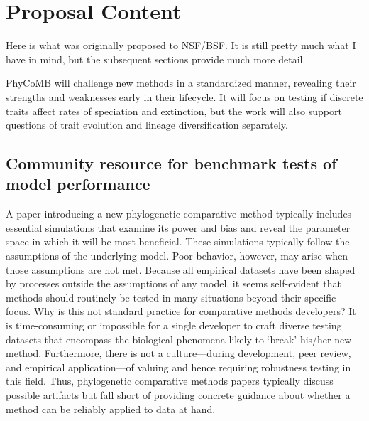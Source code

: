 \section{Proposal Content}

Here is what was originally proposed to NSF/BSF.
It is still pretty much what I have in mind, but the subsequent sections provide much more detail.

\bigskip

PhyCoMB will challenge new methods in a standardized manner, revealing their strengths and weaknesses early in their lifecycle.
It will focus on testing if discrete traits affect rates of speciation and extinction, but the work will also support questions of trait evolution and lineage diversification separately.

\subsection{Community resource for benchmark tests of model performance}

A paper introducing a new phylogenetic comparative method typically includes 
essential simulations that examine its power and bias and reveal the parameter space in which it will be most beneficial.
These simulations typically follow the assumptions of the underlying model.
Poor behavior, however, may arise when those assumptions are not met.
Because all empirical datasets have been shaped by processes outside the assumptions of any model, it seems self-evident that methods should routinely be tested in many situations beyond their specific focus.
Why is this not standard practice for comparative methods developers?
It is time-consuming or impossible for a single developer to craft diverse testing datasets that encompass the biological phenomena likely to `break' his/her new method.
Furthermore, there is not a culture---during development, peer review, and empirical application---of valuing and hence requiring robustness testing in this field.
Thus, phylogenetic comparative methods papers typically discuss possible artifacts but fall short of providing concrete guidance about whether a method can be reliably applied to data at hand. 

